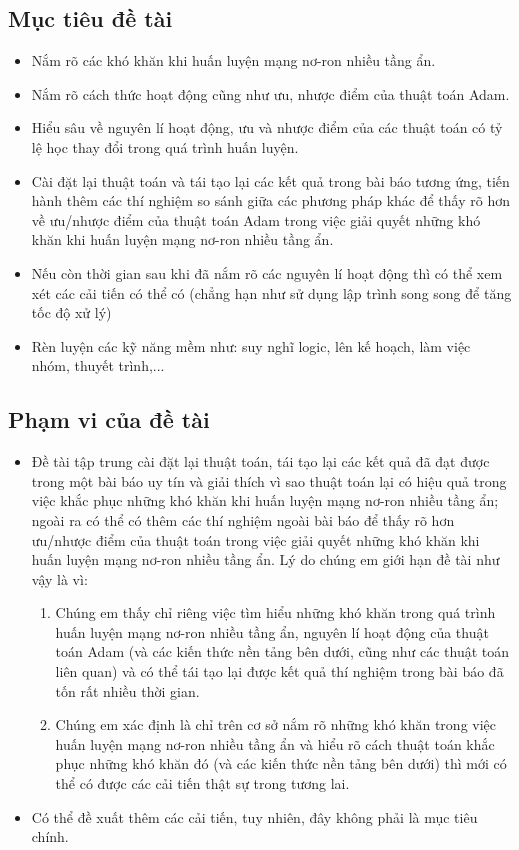 \documentclass{article}[14pt]
\begin{document}
{    \subsection{Mục tiêu đề tài}
    
    \begin{itemize}
        \item Nắm rõ các khó khăn khi huấn luyện mạng nơ-ron nhiều tầng ẩn.
        \item Nắm rõ cách thức hoạt động cũng như ưu, nhược điểm của thuật toán Adam.
        \item Hiểu sâu về nguyên lí hoạt động, ưu và nhược điểm của các thuật toán có tỷ lệ học thay đổi trong quá trình huấn luyện.
        \item Cài đặt lại thuật toán và tái tạo lại các kết quả trong bài báo tương ứng, tiến hành thêm các thí nghiệm so sánh giữa các phương pháp khác để thấy rõ hơn về ưu/nhược điểm của thuật toán Adam trong việc giải quyết những khó khăn khi huấn luyện mạng nơ-ron nhiều tầng ẩn.
        \item Nếu còn thời gian sau khi đã nắm rõ các nguyên lí hoạt động thì có thể xem xét các cải tiến có thể có (chẳng hạn như sử dụng lập trình song song để tăng tốc độ xử lý)
        \item Rèn luyện các kỹ năng mềm như: suy nghĩ logic, lên kế hoạch, làm việc nhóm, thuyết trình,...
    \end{itemize}
    
    \subsection{Phạm vi của đề tài}
    
    \begin{itemize}
        \item Đề tài tập trung cài đặt lại thuật toán, tái tạo lại các kết quả đã đạt được trong một bài báo uy tín và giải thích vì sao thuật toán lại có hiệu quả trong việc khắc phục những khó khăn khi huấn luyện mạng nơ-ron nhiều tầng ẩn; ngoài ra có thể có thêm các thí nghiệm ngoài bài báo để thấy rõ hơn ưu/nhược điểm của thuật toán trong việc giải quyết những khó khăn khi huấn luyện mạng nơ-ron nhiều tầng ẩn. Lý do chúng em giới hạn đề tài như vậy là vì:
        \begin{enumerate}
            \item Chúng em thấy chỉ riêng việc tìm hiểu những khó khăn trong quá trình huấn luyện mạng nơ-ron nhiều tầng ẩn, nguyên lí hoạt động của thuật toán Adam (và các kiến thức nền tảng bên dưới, cũng như các thuật toán liên quan) và có thể tái tạo lại được kết quả thí nghiệm trong bài báo đã tốn rất nhiều thời gian.
            \item Chúng em xác định là chỉ trên cơ sở nắm rõ những khó khăn trong việc huấn luyện mạng nơ-ron nhiều tầng ẩn và hiểu rõ cách thuật toán khắc phục những khó khăn đó (và các kiến thức nền tảng bên dưới) thì mới có thể có được các cải tiến thật sự trong tương lai.
        \end{enumerate}
   \item Có thể đề xuất thêm các cải tiến, tuy nhiên, đây không phải là mục tiêu chính.
    \end{itemize}
    
}
\end{document}
